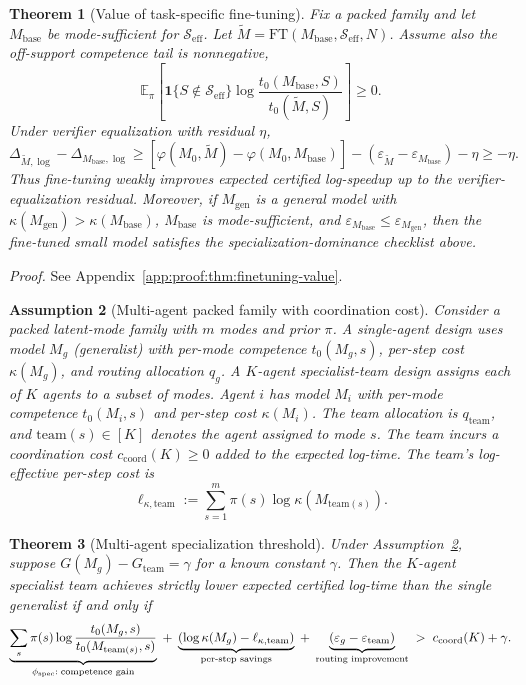 \documentclass[10pt]{article}
\theoremstyle{paperplain}
\newtheorem{theorem}{Theorem}[section]
\theoremstyle{paperdefinition}
\newtheorem{assumption}[theorem]{Assumption}
\theoremstyle{paperremark}
\newcommand{\E}{\mathbb{E}}
\newcommand{\cS}{\mathcal{S}}
\begin{document}
\begin{theorem}[Value of task-specific fine-tuning]
\label{thm:finetuning-value}
Fix a packed family and let $M_{\mathrm{base}}$ be mode-sufficient for $\cS_{\mathrm{eff}}$.
Let $\widetilde M=\mathrm{FT}(M_{\mathrm{base}},\cS_{\mathrm{eff}},N)$.
Assume also the off-support competence tail is nonnegative,
\[
\E_\pi\!\left[\mathbf{1}\{S\notin \cS_{\mathrm{eff}}\}\log\frac{t_0(M_{\mathrm{base}},S)}{t_0(\widetilde M,S)}\right]\ge 0.
\]
Under verifier equalization with residual $\eta$,
\[
\Delta_{\widetilde M,\log}-\Delta_{M_{\mathrm{base}},\log}
\ge
[\varphi(M_0,\widetilde M)-\varphi(M_0,M_{\mathrm{base}})]
-
(\varepsilon_{\widetilde M}-\varepsilon_{M_{\mathrm{base}}})
-\eta
\ge -\eta.
\]
Thus fine-tuning weakly improves expected certified log-speedup up to the verifier-equalization residual.
Moreover, if $M_{\mathrm{gen}}$ is a general model with
$\kappa(M_{\mathrm{gen}})>\kappa(M_{\mathrm{base}})$,
$M_{\mathrm{base}}$ is mode-sufficient, and
$\varepsilon_{M_{\mathrm{base}}}\le \varepsilon_{M_{\mathrm{gen}}}$,
then the fine-tuned small model satisfies the specialization-dominance checklist above.
\end{theorem}

\par\noindent\emph{Proof.} See Appendix~\ref{app:proof:thm:finetuning-value}.\par


\begin{assumption}[Multi-agent packed family with coordination cost]
\label{ass:multi-agent-packed}
Consider a packed latent-mode family with $m$ modes and prior $\pi$.
A single-agent design uses model $M_g$ (generalist) with per-mode competence $t_0(M_g, s)$, per-step cost $\kappa(M_g)$, and routing allocation $q_g$.
A $K$-agent specialist-team design assigns each of $K$ agents to a subset of modes.
Agent $i$ has model $M_i$ with per-mode competence $t_0(M_i, s)$ and per-step cost $\kappa(M_i)$.
The team allocation is $q_{\mathrm{team}}$, and $\mathrm{team}(s) \in [K]$ denotes the agent assigned to mode $s$.
The team incurs a coordination cost $c_{\mathrm{coord}}(K) \ge 0$ added to the expected log-time.
The team's log-effective per-step cost is
\[
\ell_{\kappa,\mathrm{team}}:=\sum_{s=1}^{m}\pi(s)\log \kappa(M_{\mathrm{team}(s)}).
\]
\end{assumption}

\begin{theorem}[Multi-agent specialization threshold]
\label{thm:multi-agent-exact}
Under Assumption~\ref{ass:multi-agent-packed}, suppose $G(M_g) - G_{\mathrm{team}} = \gamma$ for a known constant $\gamma$.
Then the $K$-agent specialist team achieves strictly lower expected certified log-time than the single generalist if and only if
\[
\underbrace{\sum_{s} \pi(s) \log \frac{t_0(M_g, s)}{t_0(M_{\mathrm{team}(s)}, s)}}_{\phi_{\mathrm{spec}}:\;\textup{competence gain}}
\;+\;
\underbrace{\left(\log\kappa(M_g)-\ell_{\kappa,\mathrm{team}}\right)}_{\textup{per-step savings}}
\;+\;
\underbrace{(\varepsilon_g - \varepsilon_{\mathrm{team}})}_{\textup{routing improvement}}
\;>\;
c_{\mathrm{coord}}(K) + \gamma.
\]
\end{theorem}
\end{document}
